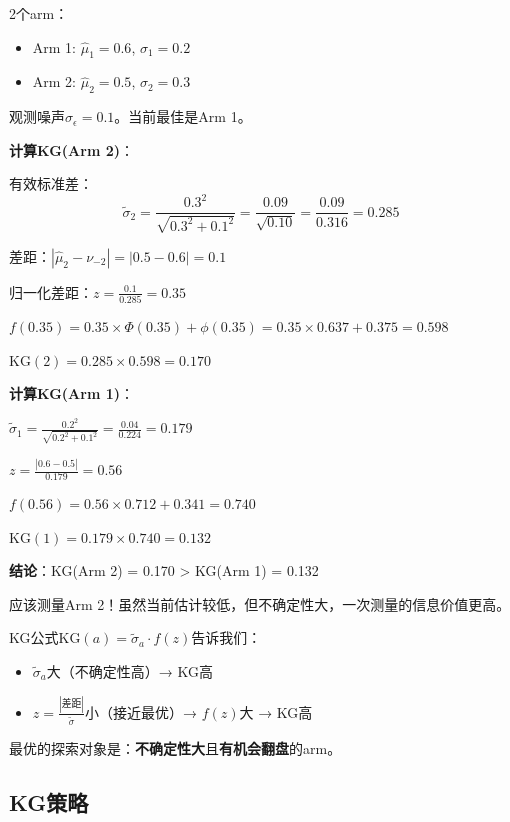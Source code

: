 \documentclass[11pt,a4paper]{article}
\theoremstyle{definition}
\begin{document}
\begin{calculation}[KG的数值计算]
2个arm：
\begin{itemize}
    \item Arm 1: $\hat{\mu}_1 = 0.6$, $\sigma_1 = 0.2$
    \item Arm 2: $\hat{\mu}_2 = 0.5$, $\sigma_2 = 0.3$
\end{itemize}

观测噪声$\sigma_\epsilon = 0.1$。当前最佳是Arm 1。

\textbf{计算KG(Arm 2)}：

有效标准差：
\[
\tilde{\sigma}_2 = \frac{0.3^2}{\sqrt{0.3^2 + 0.1^2}} = \frac{0.09}{\sqrt{0.10}} = \frac{0.09}{0.316} = 0.285
\]

差距：$|\hat{\mu}_2 - \nu_{-2}| = |0.5 - 0.6| = 0.1$

归一化差距：$z = \frac{0.1}{0.285} = 0.35$

$f(0.35) = 0.35 \times \Phi(0.35) + \phi(0.35) = 0.35 \times 0.637 + 0.375 = 0.598$

$\text{KG}(2) = 0.285 \times 0.598 = 0.170$

\textbf{计算KG(Arm 1)}：

$\tilde{\sigma}_1 = \frac{0.2^2}{\sqrt{0.2^2 + 0.1^2}} = \frac{0.04}{0.224} = 0.179$

$z = \frac{|0.6 - 0.5|}{0.179} = 0.56$

$f(0.56) = 0.56 \times 0.712 + 0.341 = 0.740$

$\text{KG}(1) = 0.179 \times 0.740 = 0.132$

\textbf{结论}：KG(Arm 2) = 0.170 > KG(Arm 1) = 0.132

应该测量Arm 2！虽然当前估计较低，但不确定性大，一次测量的信息价值更高。
\end{calculation}

\begin{keypoint}[KG的直觉]
KG公式$\text{KG}(a) = \tilde{\sigma}_a \cdot f(z)$告诉我们：

\begin{itemize}
    \item $\tilde{\sigma}_a$大（不确定性高）→ KG高
    \item $z = \frac{|\text{差距}|}{\tilde{\sigma}}$小（接近最优）→ $f(z)$大 → KG高
\end{itemize}

最优的探索对象是：\textbf{不确定性大}且\textbf{有机会翻盘}的arm。
\end{keypoint}

\subsection{KG策略}
\end{document}
